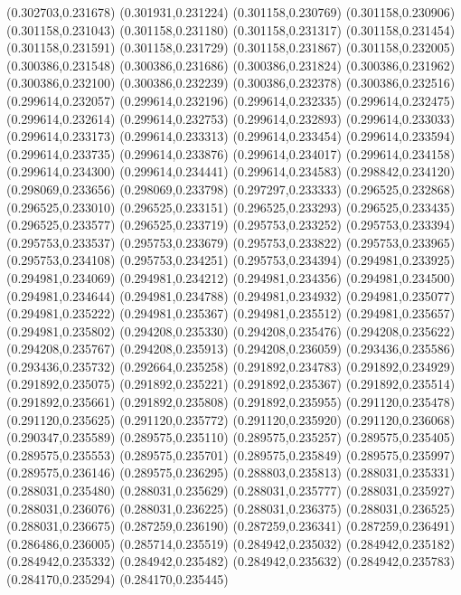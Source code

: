 (0.302703,0.231678)
(0.301931,0.231224)
(0.301158,0.230769)
(0.301158,0.230906)
(0.301158,0.231043)
(0.301158,0.231180)
(0.301158,0.231317)
(0.301158,0.231454)
(0.301158,0.231591)
(0.301158,0.231729)
(0.301158,0.231867)
(0.301158,0.232005)
(0.300386,0.231548)
(0.300386,0.231686)
(0.300386,0.231824)
(0.300386,0.231962)
(0.300386,0.232100)
(0.300386,0.232239)
(0.300386,0.232378)
(0.300386,0.232516)
(0.299614,0.232057)
(0.299614,0.232196)
(0.299614,0.232335)
(0.299614,0.232475)
(0.299614,0.232614)
(0.299614,0.232753)
(0.299614,0.232893)
(0.299614,0.233033)
(0.299614,0.233173)
(0.299614,0.233313)
(0.299614,0.233454)
(0.299614,0.233594)
(0.299614,0.233735)
(0.299614,0.233876)
(0.299614,0.234017)
(0.299614,0.234158)
(0.299614,0.234300)
(0.299614,0.234441)
(0.299614,0.234583)
(0.298842,0.234120)
(0.298069,0.233656)
(0.298069,0.233798)
(0.297297,0.233333)
(0.296525,0.232868)
(0.296525,0.233010)
(0.296525,0.233151)
(0.296525,0.233293)
(0.296525,0.233435)
(0.296525,0.233577)
(0.296525,0.233719)
(0.295753,0.233252)
(0.295753,0.233394)
(0.295753,0.233537)
(0.295753,0.233679)
(0.295753,0.233822)
(0.295753,0.233965)
(0.295753,0.234108)
(0.295753,0.234251)
(0.295753,0.234394)
(0.294981,0.233925)
(0.294981,0.234069)
(0.294981,0.234212)
(0.294981,0.234356)
(0.294981,0.234500)
(0.294981,0.234644)
(0.294981,0.234788)
(0.294981,0.234932)
(0.294981,0.235077)
(0.294981,0.235222)
(0.294981,0.235367)
(0.294981,0.235512)
(0.294981,0.235657)
(0.294981,0.235802)
(0.294208,0.235330)
(0.294208,0.235476)
(0.294208,0.235622)
(0.294208,0.235767)
(0.294208,0.235913)
(0.294208,0.236059)
(0.293436,0.235586)
(0.293436,0.235732)
(0.292664,0.235258)
(0.291892,0.234783)
(0.291892,0.234929)
(0.291892,0.235075)
(0.291892,0.235221)
(0.291892,0.235367)
(0.291892,0.235514)
(0.291892,0.235661)
(0.291892,0.235808)
(0.291892,0.235955)
(0.291120,0.235478)
(0.291120,0.235625)
(0.291120,0.235772)
(0.291120,0.235920)
(0.291120,0.236068)
(0.290347,0.235589)
(0.289575,0.235110)
(0.289575,0.235257)
(0.289575,0.235405)
(0.289575,0.235553)
(0.289575,0.235701)
(0.289575,0.235849)
(0.289575,0.235997)
(0.289575,0.236146)
(0.289575,0.236295)
(0.288803,0.235813)
(0.288031,0.235331)
(0.288031,0.235480)
(0.288031,0.235629)
(0.288031,0.235777)
(0.288031,0.235927)
(0.288031,0.236076)
(0.288031,0.236225)
(0.288031,0.236375)
(0.288031,0.236525)
(0.288031,0.236675)
(0.287259,0.236190)
(0.287259,0.236341)
(0.287259,0.236491)
(0.286486,0.236005)
(0.285714,0.235519)
(0.284942,0.235032)
(0.284942,0.235182)
(0.284942,0.235332)
(0.284942,0.235482)
(0.284942,0.235632)
(0.284942,0.235783)
(0.284170,0.235294)
(0.284170,0.235445)
